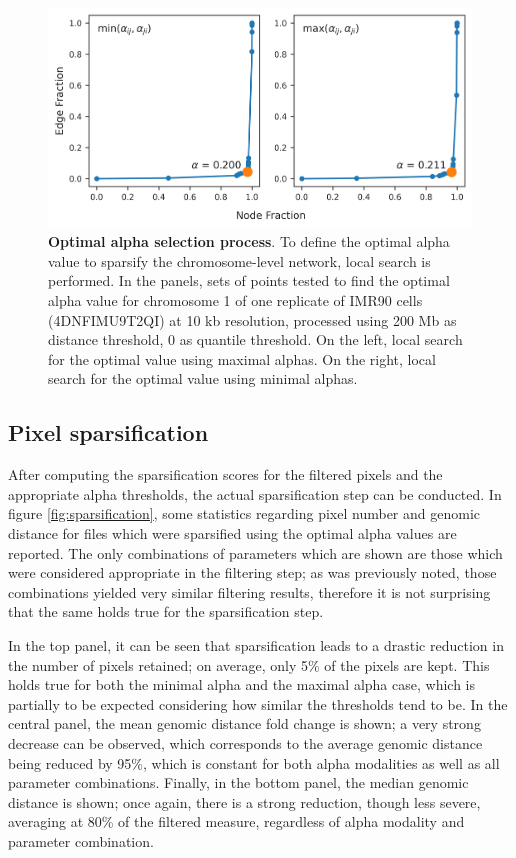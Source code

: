 \begin{figure}[h]
  \centering 
  \includegraphics[width=1\textwidth]{alpha_tables.png}
  \caption{\textbf{Optimal alpha selection process}. To define the optimal alpha value to sparsify the chromosome-level network, local search is performed. In the panels, sets of points tested to find the optimal alpha value for chromosome 1 of one replicate of IMR90 cells (4DNFIMU9T2QI) at 10 kb resolution, processed using 200 Mb as distance threshold, 0 as quantile threshold. On the left, local search for the optimal value using maximal alphas. On the right, local search for the optimal value using minimal alphas.}
  \label{fig:alphas}
\end{figure}

\subsection{Pixel sparsification}

After computing the sparsification scores for the filtered pixels and the appropriate alpha thresholds, the actual sparsification step can be conducted. In figure \ref{fig:sparsification}, some statistics regarding pixel number and genomic distance for files which were sparsified using the optimal alpha values are reported. The only combinations of parameters which are shown are those which were considered appropriate in the filtering step; as was previously noted, those combinations yielded very similar filtering results, therefore it is not surprising that the same holds true for the sparsification step.

In the top panel, it can be seen that sparsification leads to a drastic reduction in the number of pixels retained; on average, only 5\% of the pixels are kept. This holds true for both the minimal alpha and the maximal alpha case, which is partially to be expected considering how similar the thresholds tend to be. In the central panel, the mean genomic distance fold change is shown; a very strong decrease can be observed, which corresponds to the average genomic distance being reduced by 95\%, which is constant for both alpha modalities as well as all parameter combinations. Finally, in the bottom panel, the median genomic distance is shown; once again, there is a strong reduction, though less severe, averaging at 80\% of the filtered measure, regardless of alpha modality and parameter combination.

